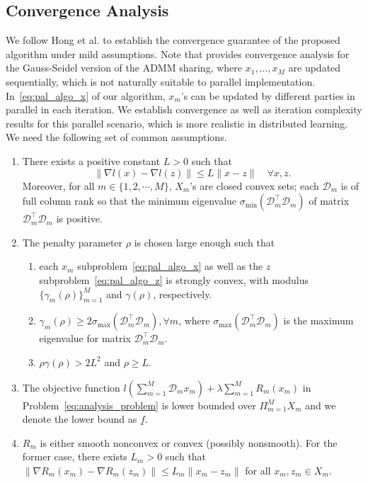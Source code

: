 \subsection{Convergence Analysis}
We follow Hong et al. \cite{hong2016convergence} to establish the convergence guarantee of the proposed algorithm under mild assumptions. Note that \cite{hong2016convergence} provides convergence analysis for the Gauss-Seidel version of the ADMM sharing, where $x_1,\ldots,x_M$ are updated sequentially, which is not naturally suitable to parallel implementation.
In~\eqref{eq:pal_algo_x} of our algorithm, $x_m$'s can be updated by different parties in parallel in each iteration.
We establish convergence as well as iteration complexity results for this parallel scenario, which is more realistic in distributed learning. We need the following set of common assumptions. 
\begin{assume}\label{theo:assumptions_pri}
\begin{enumerate}
    \item There exists a positive constant $L>0$ such that
        \[
            \|\nabla l(x)-\nabla l(z)\| \le L\|x-z\|\quad \forall x, z.
        \]
        Moreover, for all $m\in\{1,2,\cdots,M\}$, $X_m$'s are closed convex sets; each $\mathcal{D}_m$ is of full column rank so that the minimum eigenvalue $\sigma_{\text{min}}(\mathcal{D}_m^\top \mathcal{D}_m)$ of matrix $\mathcal{D}_m^\top \mathcal{D}_m$ is positive.\label{item:assum_1_pri}
    \item The penalty parameter $\rho$ is chosen large enough such that
    \begin{enumerate}
        \item each $x_m$ subproblem~\eqref{eq:pal_algo_x} as well as the $z$ subproblem~\eqref{eq:pal_algo_z} is strongly convex, with modulus $\{\gamma_m(\rho)\}_{m=1}^M$ and $\gamma(\rho)$, respectively. \label{item:asusum_2_1_pri}
        \item $\gamma_m(\rho)\ge 2\sigma_{\text{max}}(\mathcal{D}_m^\top \mathcal{D}_m), \forall m$, where $\sigma_{\text{max}}(\mathcal{D}_m^\top \mathcal{D}_m)$ is the maximum eigenvalue for matrix $\mathcal{D}_m^\top \mathcal{D}_m$.
        \item$\rho\gamma(\rho)>2L^2$ and $\rho\ge L$.
    \end{enumerate}
    \label{item:assum_2_pri}
    \item The objective function $l\left(\sum_{m=1}^{M} \mathcal{D}_mx_m\right) + \lambda\sum_{m=1}^{M} R_m(x_m)$ in Problem~\ref{eq:analysis_problem} is lower bounded over $\Pi_{m=1}^MX_m$ and we denote the lower bound as $\underline{f}$.\label{item:assum_3_pri}
    \item $R_m$ is either smooth nonconvex or convex (possibly nonsmooth). For the former case, there exists $L_m>0$ such that $\|\nabla R_m(x_m) - \nabla R_m(z_m)\|\le L_m\|x_m-z_m\|$ for all $x_m, z_m\in X_m$.\label{item:assum_4_pri}
\end{enumerate}
\end{assume}
